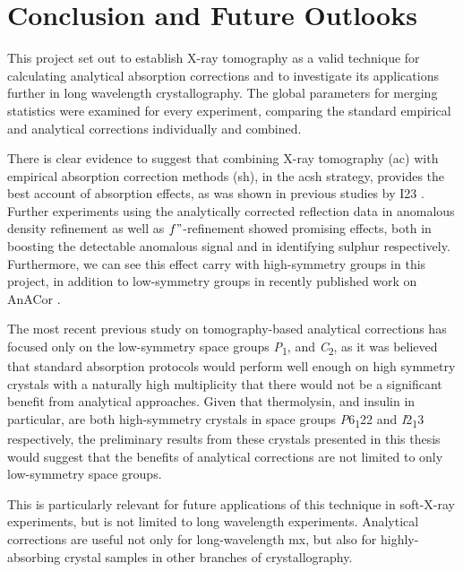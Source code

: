 \section{Conclusion and Future Outlooks}

This project set out to establish X-ray tomography as a valid technique for calculating analytical absorption corrections and to investigate its applications further in long wavelength crystallography. The global parameters for merging statistics were examined for every experiment, comparing the standard empirical and analytical corrections individually and combined.

There is clear evidence to suggest that combining X-ray tomography (\ac{ac}) with empirical absorption correction methods (\ac{sh}), in the \ac{acsh} strategy, provides the best account of absorption effects, as was shown in previous studies by I23 \cite{Lu2024}. Further experiments using the analytically corrected reflection data in anomalous density refinement as well as $f"$-refinement showed promising effects, both in boosting the detectable anomalous signal and in identifying sulphur respectively.
Furthermore, we can see this effect carry with high-symmetry groups in this project, in addition to low-symmetry groups in recently published work on AnACor \cite{Lu2024}.%

The most recent previous study on tomography-based analytical corrections has focused only on the low-symmetry space groups \textit{P}\textsubscript{1}, and \textit{C}\textsubscript{2}, as it was believed that standard absorption protocols would perform well enough on high symmetry crystals with a naturally high multiplicity that there would not be a significant benefit from analytical approaches. Given that thermolysin, and insulin in particular, are both high-symmetry crystals in space groups \textit{P}6\textsubscript{1}22 and \textit{I}2\textsubscript{1}3 respectively, the preliminary results from these crystals presented in this thesis would suggest that the benefits of analytical corrections are not limited to only low-symmetry space groups.

This is particularly relevant for future applications of this technique in soft-X-ray experiments, but is not limited to long wavelength experiments. Analytical corrections are useful not only for long-wavelength \ac{mx}, but also for highly-absorbing crystal samples in other branches of crystallography.

